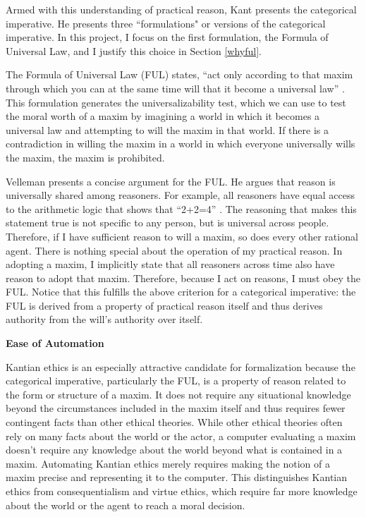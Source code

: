 \begin{isabellebody}
\begin{isamarkuptext}
Armed with this understanding of practical reason, Kant presents the categorical 
imperative. He presents three ``formulations" or versions of the categorical imperative. In this project, 
I focus on the first formulation, the Formula of Universal Law, and I justify this choice in Section \ref{whyful}.

The Formula of Universal Law (FUL) states, ``act only according to that maxim through which you can 
at the same time will that it become a universal law'' \cite[34]{groundwork}. This formulation
generates the universalizability test, which we can use to test the moral worth of a maxim by 
imagining a world in which it becomes a universal law and attempting to will the maxim in that world.
If there is a contradiction in willing the maxim in a world in which everyone universally wills the maxim,
the maxim is prohibited. 

Velleman presents a concise argument for the FUL. He argues that reason is universally shared among reasoners. For 
example, all reasoners have equal access to the arithmetic logic that shows that ``2+2=4'' \cite[29]{velleman}. The 
reasoning that makes this statement true is not specific to any person, but is universal across people. 
Therefore, if I have sufficient reason to will a maxim, so does every other rational agent. There is 
nothing special about the operation of my practical reason. 
In adopting a maxim, I implicitly state that all reasoners
across time also have reason to adopt that maxim. Therefore, because I act on reasons, I must obey the 
FUL. Notice that this fulfills the above criterion for a categorical imperative: the FUL is derived from 
a property of practical reason itself and thus derives authority from the will's authority over itself.%
\end{isamarkuptext}\isamarkuptrue%
%
\begin{isamarkuptext}%
\noindent \textbf{Ease of Automation}%
\end{isamarkuptext}\isamarkuptrue%
%
\begin{isamarkuptext}%
Kantian ethics is an especially attractive candidate for formalization because the categorical imperative, particularly the FUL, 
is a property of reason related to the form or structure of a maxim. It does not require any situational 
knowledge beyond the circumstances included
in the maxim itself and thus requires fewer contingent facts than other ethical theories.
While other ethical theories often rely on many facts about 
the world or the actor, a computer evaluating 
a maxim doesn't require any knowledge about the world beyond what is contained in a maxim. Automating 
Kantian ethics merely requires making the notion of a maxim precise and representing it to the computer. 
This distinguishes Kantian ethics from consequentialism and virtue ethics, which
require far more knowledge about the world or the agent to reach a moral decision.


\end{isamarkuptext}
\end{isabellebody}
